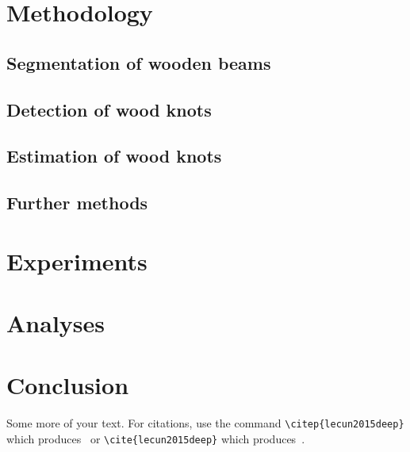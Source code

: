 \documentclass{xai-thesis}
\begin{document}
\newpage
\section{Methodology}
\label{sec_3}



\subsection{Segmentation of wooden beams}
\label{sec_3:3.1}



\newpage
\subsection{Detection of wood knots}
\label{sec_3:3.2}



\subsection{Estimation of wood knots}
\label{sec_3:3.3}



\newpage

\subsection{Further methods}
\label{sec_3:3.4}



\newpage

\section{Experiments}


\newpage
\section{Analyses}


\newpage
\section{Conclusion}


Some more of your text. For citations, use the command \verb+\citep{lecun2015deep}+ which produces~\citep{lecun2015deep} or \verb+\cite{lecun2015deep}+ which produces~\cite{lecun2015deep}.
\end{document}
